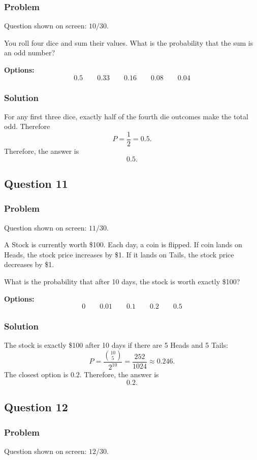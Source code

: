 \documentclass[12pt]{article}
\begin{document}
\subsubsection{Problem}
Question shown on screen: \(10/30\).

You roll four dice and sum their values. What is the probability that the sum is an odd number?

\noindent\textbf{Options:}
\[
\boxed{0.5}
\qquad
\boxed{0.33}
\qquad
\boxed{0.16}
\qquad
\boxed{0.08}
\qquad
\boxed{0.04}
\]

\subsubsection{Solution}
For any first three dice, exactly half of the fourth die outcomes make the total odd. Therefore
\[
P=\frac{1}{2}=0.5.
\]
Therefore, the answer is
\[
\boxed{0.5}.
\]

\subsection{Question 11}
\subsubsection{Problem}
Question shown on screen: \(11/30\).

A Stock is currently worth \$100. Each day, a coin is flipped. If coin lands on Heads, the stock price increases by \$1. If it lands on Tails, the stock price decreases by \$1.

What is the probability that after 10 days, the stock is worth exactly \$100?

\noindent\textbf{Options:}
\[
\boxed{0}
\qquad
\boxed{0.01}
\qquad
\boxed{0.1}
\qquad
\boxed{0.2}
\qquad
\boxed{0.5}
\]

\subsubsection{Solution}
The stock is exactly \$100 after 10 days if there are 5 Heads and 5 Tails:
\[
P=\frac{\binom{10}{5}}{2^{10}}=\frac{252}{1024}\approx 0.246.
\]
The closest option is \(0.2\). Therefore, the answer is
\[
\boxed{0.2}.
\]

\subsection{Question 12}
\subsubsection{Problem}
Question shown on screen: \(12/30\).
\end{document}
